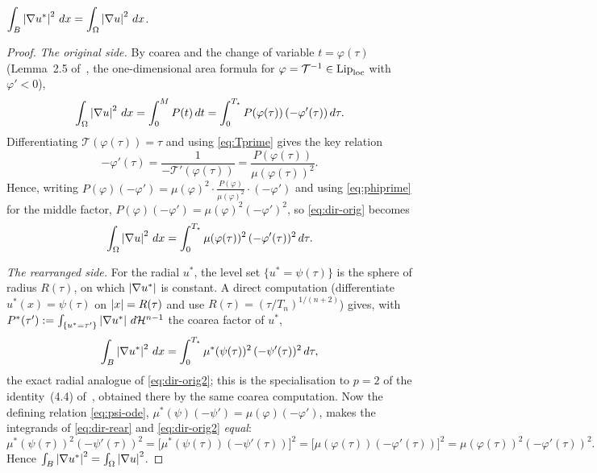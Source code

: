 \begin{lemma}\label{lem:A}
$\displaystyle\int_B\left|\nabla u^*\right|^2\,dx=\int_\Omega\left|\nabla u\right|^2\,dx$.
\end{lemma}

\begin{proof}
\emph{The original side.} By coarea and the change of variable
$t=\varphi(\tau)$ (Lemma~2.5 of~\cite{Brasco2014}, the one-dimensional area
formula for $\varphi=\mathcal T^{-1}\in\mathrm{Lip}_{\rm loc}$ with
$\varphi'<0$),
\begin{equation}\label{eq:dir-orig}
  \int_\Omega\left|\nabla u\right|^2\,dx
  =\int_0^M P(t)\,dt
  =\int_0^{T_\star}P(\varphi(\tau))\,(-\varphi'(\tau))\,d\tau .
\end{equation}
Differentiating $\mathcal T(\varphi(\tau))=\tau$ and using
\eqref{eq:Tprime} gives the key relation
\begin{equation}\label{eq:phiprime}
  -\varphi'(\tau)=\frac{1}{-\mathcal T'(\varphi(\tau))}
  =\frac{P(\varphi(\tau))}{\mu(\varphi(\tau))^2}.
\end{equation}
Hence, writing $P(\varphi)(-\varphi')=\mu(\varphi)^2\cdot
\frac{P(\varphi)}{\mu(\varphi)^2}\cdot(-\varphi')$ and using
\eqref{eq:phiprime} for the middle factor,
$P(\varphi)(-\varphi')=\mu(\varphi)^2(-\varphi')^2$, so \eqref{eq:dir-orig}
becomes
\begin{equation}\label{eq:dir-orig2}
  \int_\Omega\left|\nabla u\right|^2\,dx
  =\int_0^{T_\star}\mu(\varphi(\tau))^2\,(-\varphi'(\tau))^2\,d\tau.
\end{equation}

\emph{The rearranged side.} For the radial $u^*$, the level set
$\{u^*=\psi(\tau)\}$ is the sphere of radius $R(\tau)$, on which
$\left|\nabla u^*\right|$ is constant. A direct computation (differentiate
$u^*(x)=\psi(\tau)$ on $\left|x\right|=R(\tau)$ and use $R(\tau)=(\tau/T_n)^{1/(n+2)}$)
gives, with $P^*(\tau'):=\int_{\{u^*=\tau'\}}\left|\nabla u^*\right|\,d\mathcal H^{n-1}$ the coarea
factor of $u^*$,
\begin{equation}\label{eq:dir-rear}
  \int_B\left|\nabla u^*\right|^2\,dx
  =\int_0^{T_\star}\mu^*(\psi(\tau))^2\,(-\psi'(\tau))^2\,d\tau,
\end{equation}
the exact radial analogue of \eqref{eq:dir-orig2}; this is the
specialisation to $p=2$ of the identity~(4.4)
of~\cite{Brasco2014}, obtained there by the same coarea computation. Now
the defining relation \eqref{eq:psi-ode},
$\mu^*(\psi)(-\psi')=\mu(\varphi)(-\varphi')$, makes the integrands of
\eqref{eq:dir-rear} and \eqref{eq:dir-orig2} \emph{equal}:
\[
  \mu^*(\psi(\tau))^2(-\psi'(\tau))^2
  =\bigl[\mu^*(\psi(\tau))(-\psi'(\tau))\bigr]^2
  =\bigl[\mu(\varphi(\tau))(-\varphi'(\tau))\bigr]^2
  =\mu(\varphi(\tau))^2(-\varphi'(\tau))^2 .
\]
Hence $\int_B\left|\nabla u^*\right|^2=\int_\Omega\left|\nabla u\right|^2$.
\end{proof}

